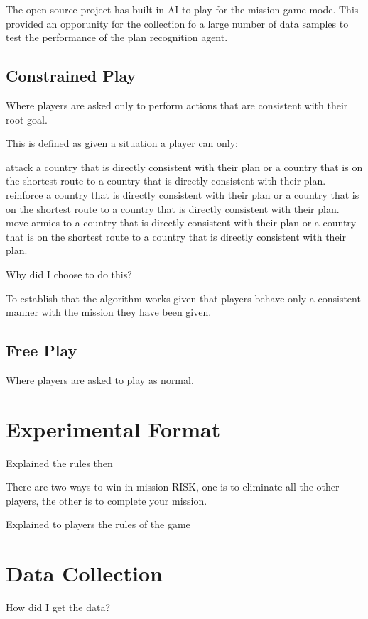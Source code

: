 \documentclass[parskip]{cs4rep}
\begin{document}
The open source project has built in AI to play for the mission game mode. This provided an opporunity for the collection fo a large number of data samples to test the performance of the plan recognition agent.

\subsection{Constrained Play}

Where players are asked only to perform actions that are consistent with their root goal.

This is defined as given a situation a player can only:

attack a country that is directly consistent with their plan or a country that is on the shortest route to a country that is directly consistent with their plan.
reinforce a country that is directly consistent with their plan or a country that is on the shortest route to a country that is directly consistent with their plan.
move armies to a country that is directly consistent with their plan or a country that is on the shortest route to a country that is directly consistent with their plan.

Why did I choose to do this?

To establish that the algorithm works given that players behave only a consistent manner with the mission they have been given.

\subsection{Free Play}

Where players are asked to play as normal.

\section{Experimental Format}

Explained the rules then

There are two ways to win in mission RISK, one is to eliminate all the other players, the other is to complete your mission.

Explained to players the rules of the game 

\section{Data Collection}

How did I get the data?
\end{document}
